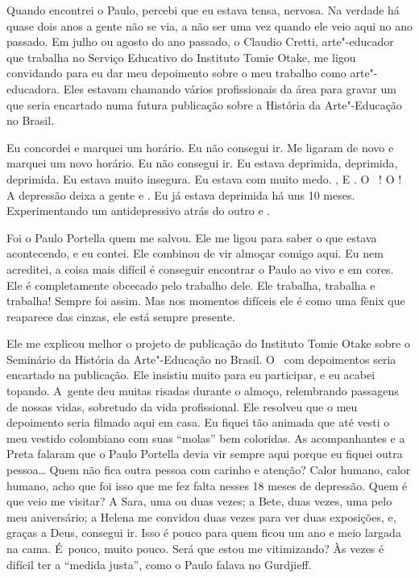 Quando encontrei o Paulo, percebi que eu estava tensa, nervosa. Na
verdade há quase dois anos a gente não se via, a não ser uma vez quando
ele veio aqui no ano passado. Em julho ou agosto do ano passado, o
Claudio Cretti, arte"-educador que trabalha no Serviço Educativo do
Instituto Tomie Otake, me ligou convidando para eu dar meu depoimento
sobre o meu trabalho como arte"-educadora. Eles estavam chamando vários
profissionais da área para gravar um  que seria encartado numa futura
publicação sobre a História da Arte"-Educação no Brasil.

Eu concordei e marquei um horário. Eu não consegui ir. Me ligaram de
novo e marquei um novo horário. Eu não consegui ir. Eu estava deprimida,
deprimida, deprimida. Eu estava muito insegura. Eu estava com muito
medo.    ,       E
  . O~   ! O    
 ! A depressão deixa a gente  e . Eu já estava
deprimida há uns 10 meses. Experimentando um antidepressivo atrás do
outro e .

Foi o Paulo Portella quem me salvou. Ele me ligou para saber o que
estava acontecendo, e eu contei. Ele combinou de vir almoçar comigo
aqui. Eu nem acreditei, a coisa mais difícil é conseguir encontrar o
Paulo ao vivo e em cores. Ele é completamente obcecado pelo trabalho
dele. Ele trabalha, trabalha e trabalha! Sempre foi assim. Mas nos
momentos difíceis ele é como uma fênix que reaparece das cinzas, ele
está sempre presente.

Ele me explicou melhor o projeto de publicação do Instituto Tomie Otake
sobre o Seminário da História da Arte"-Educação no Brasil. O~ com
depoimentos seria encartado na publicação. Ele insistiu muito para eu
participar, e eu acabei topando. A~gente deu muitas risadas durante o
almoço, relembrando passagens de nossas vidas, sobretudo da vida
profissional. Ele resolveu que o meu depoimento seria filmado aqui em
casa. Eu fiquei tão animada que até vesti o meu vestido colombiano com
suas ``molas'' bem coloridas. As acompanhantes e a Preta falaram que o
Paulo Portella devia vir sempre aqui porque eu fiquei outra
pessoa… Quem não fica outra pessoa com carinho e atenção? Calor
humano, calor humano, acho que foi isso que me fez falta nesses 18 meses
de depressão. Quem é que veio me visitar? A Sara, uma ou duas vezes; a
Bete, duas vezes, uma pelo meu aniversário; a Helena me convidou duas
vezes para ver duas exposições, e, graças a Deus, consegui ir. Isso é
pouco para quem ficou um ano e meio largada na cama. É~pouco, muito
pouco. Será que estou me vitimizando? Às vezes é difícil ter a ``medida
justa'', como o Paulo falava no Gurdjieff.

